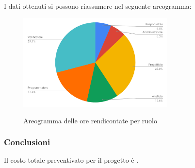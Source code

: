 I dati ottenuti si possono riassumere nel seguente areogramma:
\begin{figure}[H] 
			\centering 
				\includegraphics[width=0.7\textwidth]{res/images/areogramma_rendicontate.pdf}\\
				\caption{Areogramma delle ore rendicontate per ruolo}
			\label{AreogrammaOreRendicontate}
\end{figure}

\subsubsection{Conclusioni}
Il costo totale preventivato per il progetto è .

